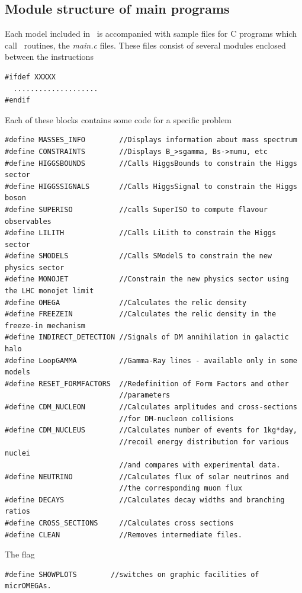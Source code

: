 \documentclass[12pt,a4paper]{article}
\begin{document}
\subsection{Module structure of main programs}
Each model included in \micro\  is accompanied with sample files for
C  programs which call \micro\ routines, the {\it main.c}  files.  
These files   consist of
several modules enclosed between the instructions
\begin{verbatim}
#ifdef XXXXX
  ....................
#endif
\end{verbatim}
Each of these blocks  contains some code for a specific problem
{\small
\begin{verbatim}
#define MASSES_INFO        //Displays information about mass spectrum 
#define CONSTRAINTS        //Displays B_>sgamma, Bs->mumu, etc
#define HIGGSBOUNDS        //Calls HiggsBounds to constrain the Higgs sector
#define HIGGSSIGNALS       //Calls HiggsSignal to constrain the Higgs boson
#define SUPERISO           //calls SuperISO to compute flavour observables
#define LILITH             //Calls LiLith to constrain the Higgs sector
#define SMODELS            //Calls SModelS to constrain the new physics sector
#define MONOJET            //Constrain the new physics sector using the LHC monojet limit
#define OMEGA              //Calculates the relic density 
#define FREEZEIN           //Calculates the relic density in the freeze-in mechanism
#define INDIRECT_DETECTION //Signals of DM annihilation in galactic halo
#define LoopGAMMA          //Gamma-Ray lines - available only in some models
#define RESET_FORMFACTORS  //Redefinition of Form Factors and other
                           //parameters 
#define CDM_NUCLEON        //Calculates amplitudes and cross-sections
                           //for DM-nucleon collisions 
#define CDM_NUCLEUS        //Calculates number of events for 1kg*day,
                           //recoil energy distribution for various nuclei
                           //and compares with experimental data.
#define NEUTRINO           //Calculates flux of solar neutrinos and
                           //the corresponding muon flux 
#define DECAYS             //Calculates decay widths and branching ratios  
#define CROSS_SECTIONS     //Calculates cross sections 
#define CLEAN              //Removes intermediate files.
\end{verbatim}

}

The  flag \\
\begin{verbatim}
#define SHOWPLOTS        //switches on graphic facilities of micrOMEGAs.
\end{verbatim}
\end{document}
